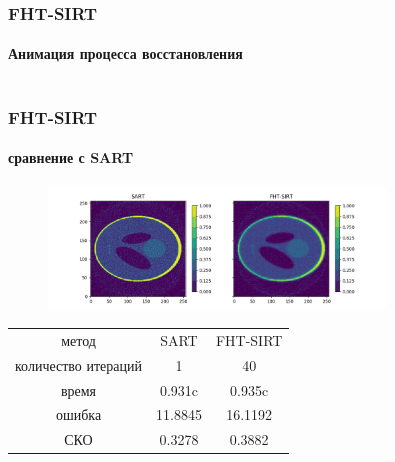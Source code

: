 \documentclass[12pt]{beamer}
\begin{document}
\begin{frame}
\frametitle{FHT-SIRT}
\framesubtitle{Анимация процесса восстановления}
\begin{columns}[T,onlytextwidth]
\begin{column}{0.4\textwidth}
\end{column}

\begin{column}{0.6\textwidth}
\end{column}
\end{columns}
\end{frame}


\begin{frame}
\frametitle{FHT-SIRT}
\framesubtitle{сравнение с SART}
  \begin{figure}
  \includegraphics[width=0.8\textwidth]{sart__fht_sirt}
  \end{figure}

\vspace{1cm}


\small
\begin{tabular}{c|c c}
    метод & SART & FHT-SIRT \\
    количество итераций & 1 & 40 \\
    время & 0.931c & 0.935c \\
    ошибка & 11.8845 & 16.1192 \\
    СКО & 0.3278 & 0.3882 \\
\end{tabular}

\end{frame}
\end{document}
